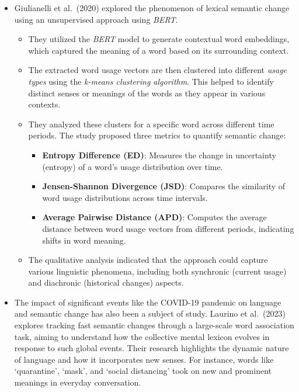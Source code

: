 \begin{itemize}
    \item {}
        Giulianelli et al.\ (2020) explored the phenomenon of lexical semantic change using an unsupervised approach using \emph{BERT}.
        \begin{itemize}
            \item They utilized the \emph{BERT} model to generate contextual word embeddings, which captured the meaning of a word based on its surrounding context.
            \item The extracted word usage vectors are then clustered into different \emph{usage types} using the \emph{k-means clustering algorithm}.
            This helped to identify distinct senses or meanings of the words as they appear in various contexts.
            \item They analyzed these clusters for a specific word across different time periods.
            The study proposed three metrics to quantify semantic change:
            \begin{itemize}
                \item \textbf{Entropy Difference (ED)}: Measures the change in uncertainty (entropy) of a word’s usage distribution over time.
                \item \textbf{Jensen-Shannon Divergence (JSD)}: Compares the similarity of word usage distributions across time intervals.
                \item \textbf{Average Pairwise Distance (APD)}: Computes the average distance between word usage vectors from different periods, indicating shifts in word meaning.
            \end{itemize}
            \item The qualitative analysis indicated that the approach could capture various linguistic phenomena, including both synchronic (current usage) and diachronic (historical changes) aspects.
        \end{itemize}

    \item {} The impact of significant events like the COVID-19 pandemic on language and semantic change has also been a subject of study.
        Laurino et al.\ (2023) explores tracking fast semantic changes through a large-scale word association task, aiming to understand how the collective mental lexicon evolves in response to such global events.
        Their research highlights the dynamic nature of language and how it incorporates new senses.
        For instance, words like `quarantine', `mask', and `social distancing' took on new and prominent meanings in everyday conversation.
\end{itemize}


